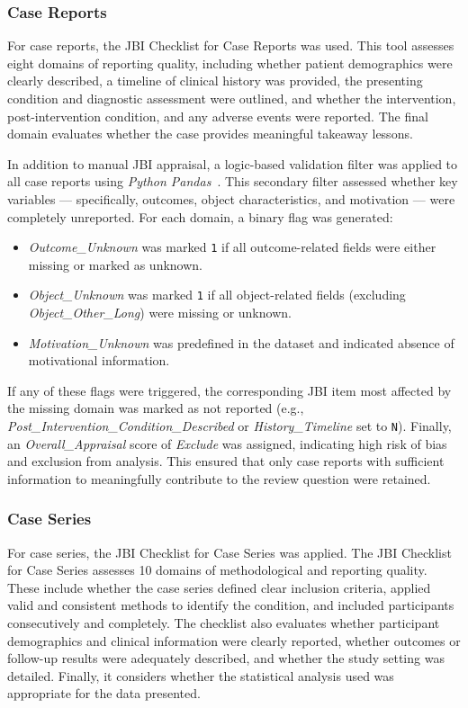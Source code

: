 \begin{appendices}
\subsubsection{Case Reports}
For case reports, the JBI Checklist for Case Reports was used. This tool assesses eight domains of reporting quality, including whether patient demographics were clearly described, a timeline of clinical history was provided, the presenting condition and diagnostic assessment were outlined, and whether the intervention, post-intervention condition, and any adverse events were reported. The final domain evaluates whether the case provides meaningful takeaway lessons.

In addition to manual JBI appraisal, a logic-based validation filter was applied to all case reports using \textit{Python Pandas}~\cite{ThePandasDevelopmentTeam_2020}. This secondary filter assessed whether key variables --- specifically, outcomes, object characteristics, and motivation --- were completely unreported. For each domain, a binary flag was generated:

\begin{itemize}
\item \textit{Outcome\_Unknown} was marked \texttt{1} if all outcome-related fields were either missing or marked as unknown.
\item \textit{Object\_Unknown} was marked \texttt{1} if all object-related fields (excluding \textit{Object\_Other\_Long}) were missing or unknown.
\item \textit{Motivation\_Unknown} was predefined in the dataset and indicated absence of motivational information.
\end{itemize}

If any of these flags were triggered, the corresponding JBI item most affected by the missing domain was marked as not reported (e.g., \textit{Post\_Intervention\_Condition\_Described} or \textit{History\_Timeline} set to \texttt{N}). Finally, an \textit{Overall\_Appraisal} score of \textit{Exclude} was assigned, indicating high risk of bias and exclusion from analysis. This ensured that only case reports with sufficient information to meaningfully contribute to the review question were retained.\\

\subsubsection{Case Series}
For case series, the JBI Checklist for Case Series was applied. The JBI Checklist for Case Series assesses 10 domains of methodological and reporting quality. These include whether the case series defined clear inclusion criteria, applied valid and consistent methods to identify the condition, and included participants consecutively and completely. The checklist also evaluates whether participant demographics and clinical information were clearly reported, whether outcomes or follow-up results were adequately described, and whether the study setting was detailed. Finally, it considers whether the statistical analysis used was appropriate for the data presented.


\end{appendices}
